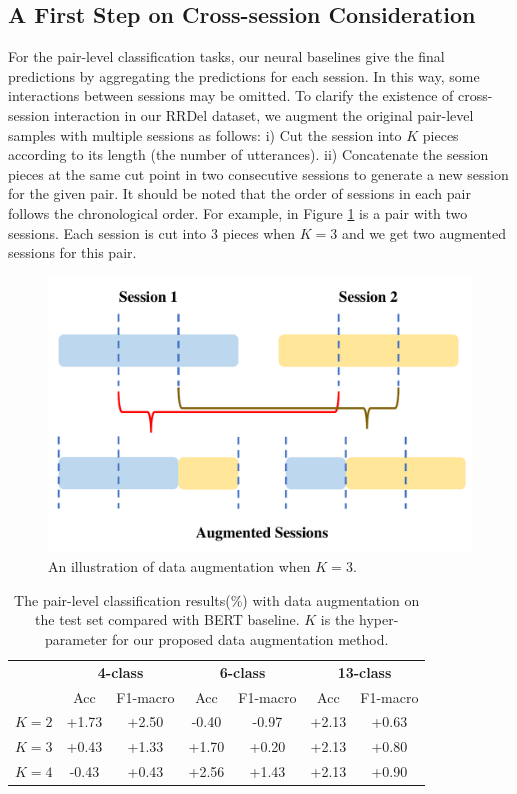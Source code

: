 \subsection{A First Step on Cross-session Consideration}
\label{sec:cross}

For the pair-level classification tasks, our neural baselines give the final predictions by aggregating the predictions for each session. In this way, some interactions between sessions may be omitted. To clarify the existence of cross-session interaction in our RRDel dataset, we augment the original pair-level samples with multiple sessions as follows: i) Cut the session into $K$ pieces according to its length (the number of utterances). ii) Concatenate the session pieces at the same cut point in two consecutive sessions to generate a new session for the given pair. It should be noted that the order of sessions in each pair follows the chronological order. For example, in Figure \ref{fig:augment} is a pair with two sessions. Each session is cut into 3 pieces when $K=3$ and we get two augmented sessions for this pair.
\begin{figure}[t!]
	\centering
	\includegraphics[width=0.7\columnwidth]{augment.pdf}
	\caption{An illustration of data augmentation when $K=3$. }
	\label{fig:augment}
\end{figure}


\begin{table}[th]
	\centering
	\scriptsize
	\begin{tabular}{@{}lcccccc@{}}
		\toprule[1.5pt]
		& \multicolumn{2}{c}{\textbf{4-class}} & \multicolumn{2}{c}{\textbf{6-class}} & \multicolumn{2}{c}{\textbf{13-class}} \\ 
		& Acc & F1-macro                 & Acc & F1-macro                  & Acc & F1-macro \\
		\midrule
		$K=2$   &+1.73 &+2.50  &-0.40& -0.97& +2.13 & +0.63 \\		
		$K=3$    &+0.43 &+1.33 &+1.70 &+0.20 &+2.13 &+0.80 \\
		$K=4$    &-0.43 &+0.43 &+2.56 &+1.43 &+2.13 &+0.90 \\
		\bottomrule[1.5pt]
		
	\end{tabular}
	\caption{The pair-level classification results(\%) with data augmentation on the test set compared with BERT baseline. $K$ is the hyper-parameter for our proposed data augmentation method.}
	\label{tab:cross}
\end{table}

